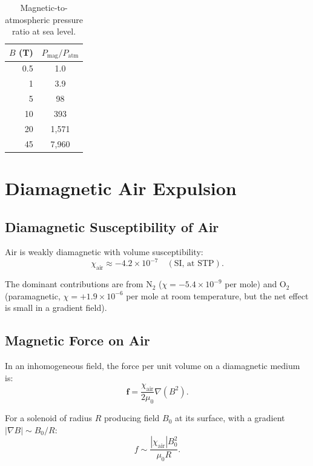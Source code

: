 \documentclass[11pt,a4paper]{article}
\begin{document}
\begin{table}[h]
\centering
\caption{Magnetic-to-atmospheric pressure ratio at sea level.}
\begin{tabular}{rS}
\toprule
{$B$ (T)} & {$P_{\mathrm{mag}}/P_{\mathrm{atm}}$} \\
  & 1.0 \\
1    & 3.9 \\
5    & 98 \\
10   & 393 \\
20   & 1{,}571 \\
45   & 7{,}960 \\
\bottomrule
\end{tabular}
\end{table}

\section{Diamagnetic Air Expulsion}\label{sec:diamagnetic}

\subsection{Diamagnetic Susceptibility of Air}

Air is weakly diamagnetic with volume susceptibility:
\begin{equation}
\chi_{\mathrm{air}} \approx -4.2 \times 10^{-7} \quad (\text{SI, at STP}).
\end{equation}

The dominant contributions are from N$_2$ ($\chi = -5.4 \times 10^{-9}$ per mole)
and O$_2$ (paramagnetic, $\chi = +1.9 \times 10^{-6}$ per mole at room temperature,
but the net effect is small in a gradient field).

\subsection{Magnetic Force on Air}

In an inhomogeneous field, the force per unit volume on a diamagnetic medium is:
\begin{equation}
\mathbf{f} = \frac{\chi_{\mathrm{air}}}{2\mu_0} \nabla(B^2).
\end{equation}

For a solenoid of radius $R$ producing field $B_0$ at its surface, with a gradient
$|\nabla B| \sim B_0/R$:
\begin{equation}
f \sim \frac{|\chi_{\mathrm{air}}| B_0^2}{\mu_0 R}.
\end{equation}
\end{document}
